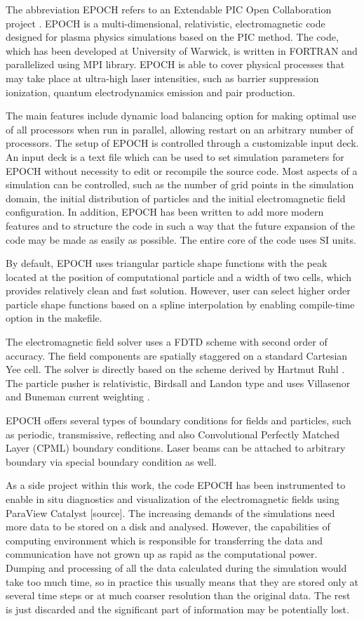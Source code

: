 The abbreviation EPOCH refers to an Extendable PIC Open Collaboration project \cite{bennett}. EPOCH is a multi-dimensional, relativistic, electromagnetic code designed for plasma physics simulations based on the PIC method. The code, which has been developed at University of Warwick, is written in FORTRAN and parallelized using MPI library. EPOCH is able to cover physical processes that may take place at ultra-high laser intensities, such as barrier suppression ionization, quantum electrodynamics emission and pair production.

The main features include dynamic load balancing option for making optimal use of all processors when run in parallel, allowing restart on an arbitrary number of processors. The setup of EPOCH is controlled through a customizable input deck. An input deck is a text file which can be used to set simulation parameters for EPOCH without necessity to edit or recompile the source code. Most aspects of a simulation can be controlled, such as the number of grid points in the simulation domain, the initial distribution of particles and the initial electromagnetic field configuration. In addition, EPOCH has been written to add more modern features and to structure the code in such a way that the future expansion of the code may be made as easily as possible. The entire core of the code uses SI units.

By default, EPOCH uses triangular particle shape functions with the peak located at the position of computational particle and a width of two cells, which provides relatively clean and fast solution. However, user can select higher order particle shape functions based on a spline interpolation by enabling compile-time option in the makefile.

The electromagnetic field solver uses a FDTD scheme with second order of accuracy. The field components are spatially staggered on a standard Cartesian Yee cell. The solver is directly based on the scheme derived by Hartmut Ruhl \cite{ruhl}. The particle pusher is relativistic, Birdsall and Landon type \cite{birdsall} and uses Villasenor and Buneman current weighting \cite{villasenor}.

EPOCH offers several types of boundary conditions for fields and particles, such as periodic, transmissive, reflecting and also Convolutional Perfectly Matched Layer (CPML) boundary conditions. Laser beams can be attached to arbitrary boundary via special boundary condition as well.

As a side project within this work, the code EPOCH has been instrumented to enable in situ diagnostics and visualization of the electromagnetic fields using ParaView Catalyst [source].
The increasing demands of the simulations need more data to be stored on a disk and analysed. However, the capabilities of computing environment which is responsible for transferring the data and communication have not grown up as rapid as the computational power. Dumping and processing of all the data calculated during the simulation would take too much time, so in practice this usually means that they are stored only at several time steps or at much coarser resolution than the original data. The rest is just discarded and the significant part of information may be potentially lost.

